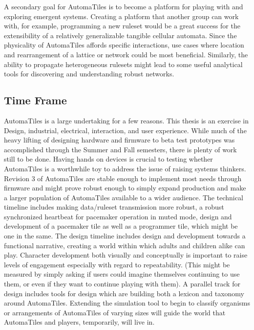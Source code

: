 A secondary goal for AutomaTiles is to become a platform for playing with and exploring emergent systems. Creating a platform that another group can work with, for example, programming a new ruleset would be a great success for the extensibility of a relatively generalizable tangible cellular automata. Since the physicality of AutomaTiles affords specific interactions, use cases where location and rearrangement of a lattice or network could be most beneficial. Similarly, the ability to propagate heterogeneous rulesets might lead to some useful analytical tools for discovering and understanding robust networks.

\subsection{Time Frame}

AutomaTiles is a large undertaking for a few reasons. This thesis is an exercise in Design, industrial, electrical, interaction, and user experience. While much of the heavy lifting of designing hardware and firmware to beta test prototypes was accomplished through the Summer and Fall semesters, there is plenty of work still to be done. Having hands on devices is crucial to testing whether AutomaTiles is a worthwhile toy to address the issue of raising systems thinkers. Revision 3 of AutomaTiles are stable enough to implement most needs through firmware and might prove robust enough to simply expand production and make a larger population of AutomaTiles available to a wider audience. The technical timeline includes making data/ruleset transmission more robust, a robust synchronized heartbeat for pacemaker operation in muted mode, design and development of a pacemaker tile as well as a programmer tile, which might be one in the same. The design timeline includes design and development towards a functional narrative, creating a world within which adults and children alike can play. Character development both visually and conceptually is important to raise levels of engagement especially with regard to repeatability. (This might be measured by simply asking if users could imagine themselves continuing to use them, or even if they want to continue playing with them). A parallel track for design includes tools for design which are building both a lexicon and taxonomy around AutomaTiles. Extending the simulation tool to begin to classify organisms or arrangements of AutomaTiles of varying sizes will guide the world that AutomaTiles and players, temporarily, will live in.

